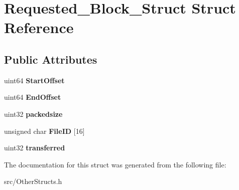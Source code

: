 \section{Requested\_\-Block\_\-Struct Struct Reference}
\label{structRequested__Block__Struct}
\subsection*{Public Attributes}
\begin{DoxyCompactItemize}
\item 
uint64 {\bfseries StartOffset}\label{structRequested__Block__Struct_a671780a82d82159bbbe1ae20abd83587}

\item 
uint64 {\bfseries EndOffset}\label{structRequested__Block__Struct_a0e276c08fde6a2e542392f85ef978622}

\item 
uint32 {\bfseries packedsize}\label{structRequested__Block__Struct_ab52bde9d2abbb85fd673ff66c95e3f25}

\item 
unsigned char {\bfseries FileID} [16]\label{structRequested__Block__Struct_aea95c7a16e646ecb4d57c9a0628dad50}

\item 
uint32 {\bfseries transferred}\label{structRequested__Block__Struct_a2b05f3e49991b8df039aee32505fee84}

\end{DoxyCompactItemize}


The documentation for this struct was generated from the following file:\begin{DoxyCompactItemize}
\item 
src/OtherStructs.h\end{DoxyCompactItemize}
